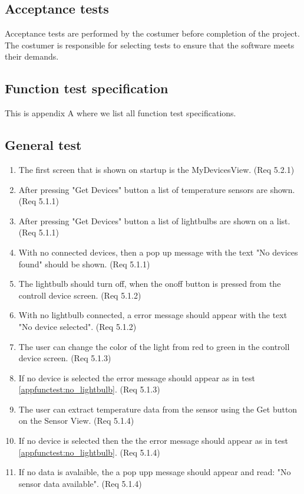 \documentclass[a4paper]{article}
\newlength{\testlabellength}
\newenvironment{testlist}{\begin{enumerate}[label=\bfseries Test \thesubsection.\arabic* , labelindent=0pt, labelwidth=\testlabellength , leftmargin=2cm]}{\end{enumerate}}
\begin{document}
\subsection{Acceptance tests}
Acceptance tests are performed by the costumer before completion of the project. The costumer is responsible for selecting tests to ensure that the software meets their demands.

\newpage
\begin{appendices}

\section{Function test specification} \label{appendix:section:functiontest}
This is appendix A where we list all function test specifications.

\subsection{General test}
%
%

\begin{testlist}
	\item The first screen that is shown on startup is the MyDevicesView. (Req 5.2.1)
	\item After pressing "Get Devices" button a list of temperature sensors are shown. (Req 5.1.1)
	\item After pressing  "Get Devices" button a list of lightbulbs are shown on a list. (Req 5.1.1)
    \item With no connected devices, then a pop up message with the text "No devices found" should be shown. (Req 5.1.1)
	\item The lightbulb should turn off, when the onoff button is pressed from the controll device screen. (Req 5.1.2)
    \item With no lightbulb connected, a error message should appear with the text "No device selected". (Req 5.1.2) \label{appfunctest:no_lightbulb}
    \item The user can change the color of the light from red to green in the controll device screen. (Req 5.1.3)
    \item If no device is selected the error message should appear as in test \ref{appfunctest:no_lightbulb}. (Req 5.1.3)
    \item The user can extract temperature data from the sensor using the Get button on the Sensor View. (Req 5.1.4)
    \item If no device is selected then the the error message should appear as in test \ref{appfunctest:no_lightbulb}. (Req 5.1.4)
    \item If no data is avalaible, the a pop upp message should appear and read: "No sensor data available". (Req 5.1.4)
\end{testlist}


\end{appendices}
\end{document}
